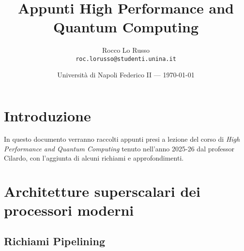 \documentclass{article}
\title{Appunti High Performance and Quantum Computing}
\author{Rocco Lo Russo \\ \texttt{roc.lorusso@studenti.unina.it}}
\date{Università di Napoli Federico II --- \today}
\begin{document}
\maketitle

\section*{Introduzione}
In questo documento verranno raccolti appunti presi a lezione del corso di \textit{High Performance and Quantum Computing} tenuto nell'anno 2025-26 dal professor Cilardo, con l'aggiunta di alcuni richiami e approfondimenti. 

\tableofcontents
\newpage


\section{Architetture superscalari dei processori moderni}
\subsection{Richiami Pipelining}

\end{document}
